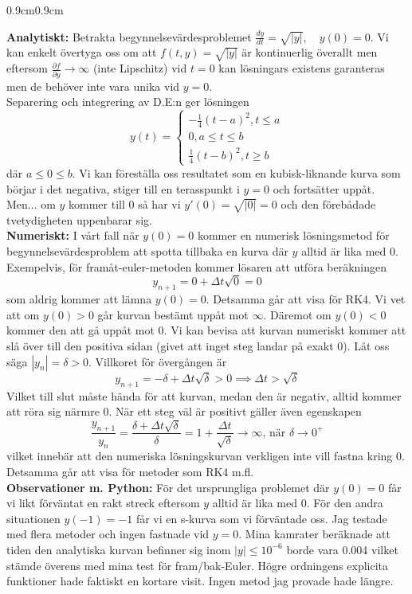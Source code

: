 \documentclass{article}
\begin{document}
\begin{adjustwidth}{0.9cm}{0.9cm}

\textbf{Analytiskt:} Betrakta begynnelsevärdesproblemet $\frac{dy}{dt} = \sqrt{|y|},\quad y(0) = 0$. Vi kan enkelt övertyga oss om att $f(t,y)=\sqrt{|y|}$ är kontinuerlig överallt men eftersom $\frac{\partial f}{\partial y}\to \infty$ (inte Lipschitz) vid $t=0$ kan lösningars existens garanteras men de behöver inte vara unika vid $y=0$.
\medskip\\
Separering och integrering av D.E:n ger lösningen 
\[
y(t)=
\begin{cases}
-\frac{1}{4}(t-a)^2 , t\leq a\\
0, a\leq t \leq b\\
\frac{1}{4}(t-b)^2, t\geq b
\end{cases}
\]
där $a\leq 0\leq b$. Vi kan föreställa oss resultatet som en kubisk-liknande kurva som börjar i det negativa, stiger till en terasspunkt i $y=0$ och fortsätter uppåt. Men... om $y$ kommer till $0$ så har vi $y'(0)=\sqrt{|0|} = 0$ och den förebådade tvetydigheten uppenbarar sig. 
\medskip\\
\textbf{Numeriskt:} I vårt fall när $y(0)=0$ kommer en numerisk lösningsmetod för begynnelsevärdesproblem att spotta tillbaka en kurva där $y$ alltid är lika med $0$. Exempelvis, för framåt-euler-metoden kommer lösaren att utföra beräkningen
\[
y_{n+1} = 0 + \Delta t\sqrt{0} =0
\]
som aldrig kommer att lämna $y(0)=0$. Detsamma går att visa för RK4. Vi vet att om $y(0) > 0$ går kurvan bestämt uppåt mot $\infty$. Däremot om $y(0) < 0$ kommer den att gå uppåt mot $0$. Vi kan bevisa att kurvan numeriskt kommer att slå över till den positiva sidan (givet att inget steg landar på exakt $0$). Låt oss säga $|y_n| = \delta > 0$. Villkoret för övergången är
\[
y_{n+1} = -\delta + \Delta t\sqrt{\delta} > 0 \implies \Delta t>\sqrt{\delta}
\]
Vilket till slut måste hända för att kurvan, medan den är negativ, alltid kommer att röra sig närmre 0. När ett steg väl är positivt gäller även egenskapen
\[
\frac{y_{n+1}}{y_n} = \frac{\delta+\Delta t\sqrt{\delta}}{\delta} = 1 + \frac{\Delta t}{\sqrt{\delta}} \to \infty \text{, när } \delta \to 0^{+}
\]
vilket innebär att den numeriska lösningskurvan verkligen inte vill fastna kring $0$. Detsamma går att visa för metoder som RK4 m.fl.
\medskip\\
\textbf{Observationer m. Python:} För det ursprungliga problemet där $y(0)=0$ får vi likt förväntat en rakt streck eftersom $y$ alltid är lika med $0$. För den andra situationen $y(-1)=-1$ får vi en s-kurva som vi förväntade oss. Jag testade med flera metoder och ingen fastnade vid $y=0$. Mina kamrater beräknade att tiden den analytiska kurvan befinner sig inom $|y|\leq10^{-6}$ borde vara 0.004 vilket stämde överens med mina test för fram/bak-Euler. Högre ordningens explicita funktioner hade faktiskt en kortare visit. Ingen metod jag provade hade längre. 
\end{adjustwidth}
\end{document}
